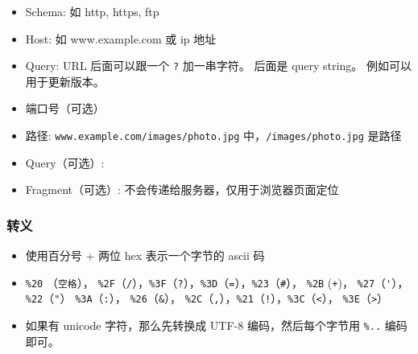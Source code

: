 

\begin{issues}
\issueDraft
\end{issues}

\begin{itemize}
\item Schema: 如 http, https, ftp
\item Host: 如 www.example.com 或 ip 地址
\item Query: URL 后面可以跟一个 \verb`?` 加一串字符。 后面是 query string。 例如可以用于更新版本。
\item 端口号（可选）
\item 路径: \verb`www.example.com/images/photo.jpg` 中，\verb`/images/photo.jpg` 是路径
\item Query（可选）:
\item Fragment（可选）: 不会传递给服务器，仅用于浏览器页面定位
\end{itemize}

\subsubsection{转义}
\begin{itemize}
\item 使用百分号 + 两位 hex 表示一个字节的 ascii 码
\item \verb`%20` （\verb`空格`）， \verb`%2F`（\verb`/`），\verb`%3F`（\verb`?`），\verb`%3D`（\verb`=`），\verb`%23`（\verb`#`）， \verb`%2B` (\verb`+`)， \verb`%27`（\verb`'`），\verb`%22`（\verb`"`） \verb`%3A`（\verb`:`）， \verb`%26`（\verb`&`）， \verb`%2C`（\verb`,`），\verb`%21`（\verb`!`），\verb`%3C`（\verb`<`）， \verb`%3E`（\verb`>`）
\item 如果有 unicode 字符，那么先转换成 UTF-8 编码，然后每个字节用 \verb`%..` 编码即可。
\end{itemize}

